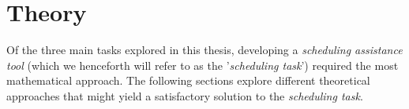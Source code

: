 \section{Theory}
Of the three main tasks explored in this thesis, developing a \emph{scheduling assistance tool} (which we henceforth will refer to as the '\emph{scheduling task}') required the most mathematical approach. 
The following sections explore different theoretical approaches that might yield a satisfactory solution to the \emph{scheduling task}.




